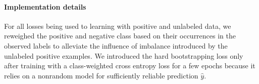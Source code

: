 \paragraph{Implementation details}
For all losses being used to learning with positive and unlabeled data, we reweighed the positive and negative class based on their occurrences in the observed labels to alleviate the influence of imbalance introduced by the unlabeled positive examples.
We introduced the hard bootstrapping loss only after training with a class-weighted cross entropy loss for a few epochs because it relies on a nonrandom model for sufficiently reliable prediction $\hat{y}$.




